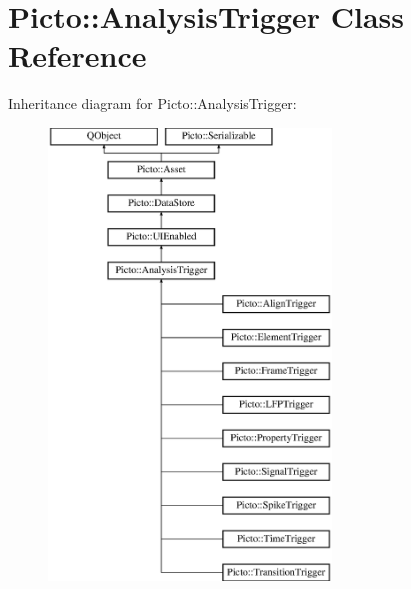 \hypertarget{class_picto_1_1_analysis_trigger}{\section{Picto\-:\-:Analysis\-Trigger Class Reference}
\label{class_picto_1_1_analysis_trigger}
}
Inheritance diagram for Picto\-:\-:Analysis\-Trigger\-:\begin{figure}[H]
\begin{center}
\leavevmode
\includegraphics[height=12.000000cm]{class_picto_1_1_analysis_trigger}
\end{center}
\end{figure}
